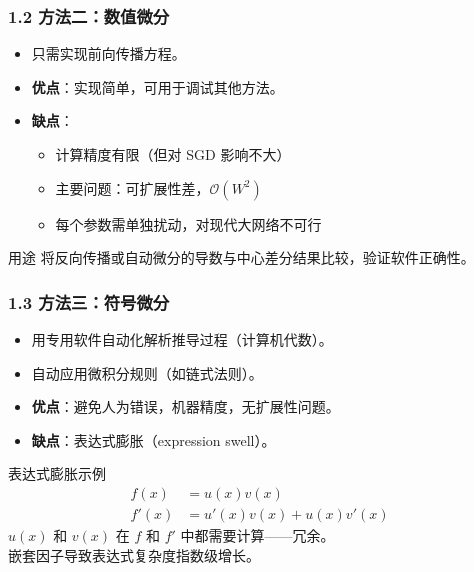 \documentclass[t,aspectratio=169]{beamer} %
\begin{document}
\begin{frame}
    \frametitle{1.2 方法二：数值微分}
    \begin{itemize}
        \item 只需实现\alert{前向传播方程}。
        \item \textbf{优点}：实现简单，可用于\alert{调试其他方法}。
        \item \textbf{缺点}：
        \begin{itemize}
            \item 计算精度有限（但对 SGD 影响不大）
            \item 主要问题：\alert{可扩展性差}，$\mathcal{O}(W^2)$
            \item 每个参数需单独扰动，对现代大网络不可行
        \end{itemize}
    \end{itemize}
    \begin{block}{用途}
        将反向传播或自动微分的导数与\alert{中心差分}结果比较，验证软件正确性。
    \end{block}
\end{frame}

\begin{frame}
    \frametitle{1.3 方法三：符号微分}
    \begin{itemize}
        \item 用专用软件自动化解析推导过程（计算机代数）。
        \item 自动应用微积分规则（如链式法则）。
        \item \textbf{优点}：避免人为错误，机器精度，无扩展性问题。
        \item \textbf{缺点}：\alert{表达式膨胀}（expression swell）。
    \end{itemize}
    \begin{block}{表达式膨胀示例}
        \begin{align}
            f(x) &= u(x)v(x) \tag{8.42} \\
            f'(x) &= u'(x)v(x) + u(x)v'(x) \tag{8.43}
        \end{align}
        $u(x)$ 和 $v(x)$ 在 $f$ 和 $f'$ 中都需要计算——\alert{冗余}。\\
        嵌套因子导致表达式复杂度\alert{指数级增长}。
    \end{block}
\end{frame}
\end{document}
